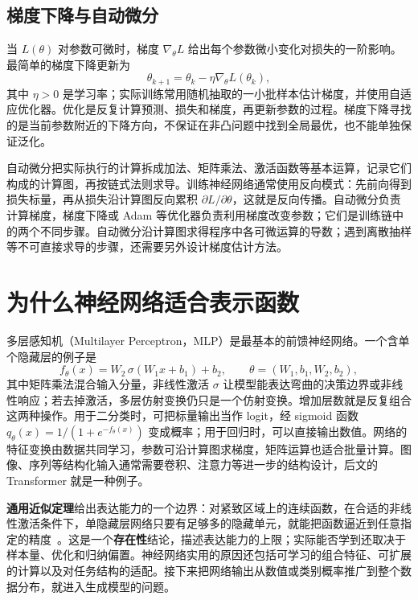 \subsection{梯度下降与自动微分}

当 \(L(\theta)\) 对参数可微时，梯度 \(\nabla_\theta L\) 给出每个参数微小变化对损失的一阶影响。最简单的梯度下降更新为
\begin{equation}
  \theta_{k+1}=\theta_k-\eta\nabla_\theta L(\theta_k),
  \label{eq:basic-gradient-descent}
\end{equation}
其中 \(\eta>0\) 是学习率；实际训练常用随机抽取的一小批样本估计梯度，并使用自适应优化器。优化是反复计算预测、损失和梯度，再更新参数的过程。梯度下降寻找的是当前参数附近的下降方向，不保证在非凸问题中找到全局最优，也不能单独保证泛化。

自动微分把实际执行的计算拆成加法、矩阵乘法、激活函数等基本运算，记录它们构成的计算图，再按链式法则求导。训练神经网络通常使用反向模式：先前向得到损失标量，再从损失沿计算图反向累积 \(\partial L/\partial\theta\)，这就是反向传播。自动微分负责计算梯度，梯度下降或 Adam 等优化器负责利用梯度改变参数；它们是训练链中的两个不同步骤。自动微分沿计算图求得程序中各可微运算的导数；遇到离散抽样等不可直接求导的步骤，还需要另外设计梯度估计方法。

\section{为什么神经网络适合表示函数}

多层感知机（Multilayer Perceptron，MLP）是最基本的前馈神经网络。一个含单个隐藏层的例子是
\begin{equation}
  f_\theta(x)=W_2\,\sigma(W_1x+b_1)+b_2,
  \qquad \theta=(W_1,b_1,W_2,b_2),
  \label{eq:basic-mlp}
\end{equation}
其中矩阵乘法混合输入分量，非线性激活 \(\sigma\) 让模型能表达弯曲的决策边界或非线性响应；若去掉激活，多层仿射变换仍只是一个仿射变换。增加层数就是反复组合这两种操作。用于二分类时，可把标量输出当作 logit，经 sigmoid 函数 \(q_\theta(x)=1/(1+e^{-f_\theta(x)})\) 变成概率；用于回归时，可以直接输出数值。网络的特征变换由数据共同学习，参数可沿计算图求梯度，矩阵运算也适合批量计算。图像、序列等结构化输入通常需要卷积、注意力等进一步的结构设计，后文的 Transformer 就是一种例子。

\textbf{通用近似定理}给出表达能力的一个边界：对紧致区域上的连续函数，在合适的非线性激活条件下，单隐藏层网络只要有足够多的隐藏单元，就能把函数逼近到任意指定的精度~\cite{cybenko1989approximation,hornik1991approximation}。这是一个\textbf{存在性}结论，描述表达能力的上限；实际能否学到还取决于样本量、优化和归纳偏置。神经网络实用的原因还包括可学习的组合特征、可扩展的计算以及对任务结构的适配。接下来把网络输出从数值或类别概率推广到整个数据分布，就进入生成模型的问题。

